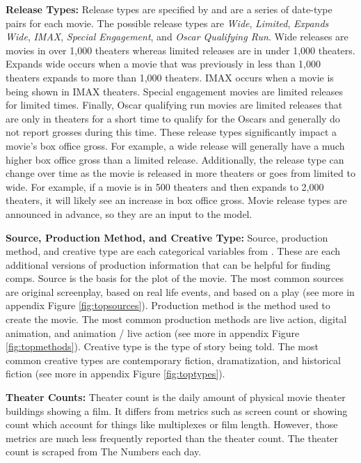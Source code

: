 \documentclass[12pt]{article}
\begin{document}
\textbf{Release Types:} Release types are specified by \cite{numbersHome} and are a series of date-type pairs for each movie. The possible release types are \textit{Wide}, \textit{Limited}, \textit{Expands Wide}, \textit{IMAX}, \textit{Special Engagement}, and \textit{Oscar Qualifying Run}. Wide releases are movies in over 1,000 theaters whereas limited releases are in under 1,000 theaters. Expands wide occurs when a movie that was previously in less than 1,000 theaters expands to more than 1,000 theaters. IMAX occurs when a movie is being shown in IMAX theaters. Special engagement movies are limited releases for limited times. Finally, Oscar qualifying run movies are limited releases that are only in theaters for a short time to qualify for the Oscars and generally do not report grosses during this time. These release types significantly impact a movie's box office gross. For example, a wide release will generally have a much higher box office gross than a limited release. Additionally, the release type can change over time as the movie is released in more theaters or goes from limited to wide. For example, if a movie is in 500 theaters and then expands to 2,000 theaters, it will likely see an increase in box office gross. Movie release types are announced in advance, so they are an input to the model.

\textbf{Source, Production Method, and Creative Type:} Source, production method, and creative type are each categorical variables from \cite{numbersHome}. These are each additional versions of production information that can be helpful for finding comps. Source is the basis for the plot of the movie. The most common sources are original screenplay, based on real life events, and based on a play (see more in appendix Figure \ref{fig:topsources}). Production method is the method used to create the movie. The most common production methods are live action, digital animation, and animation / live action (see more in appendix Figure \ref{fig:topmethods}). Creative type is the type of story being told. The most common creative types are contemporary fiction, dramatization, and historical fiction (see more in appendix Figure \ref{fig:toptypes}).

\textbf{Theater Counts:} Theater count is the daily amount of physical movie theater buildings showing a film. It differs from metrics such as screen count or showing count which account for things like multiplexes or film length. However, those metrics are much less frequently reported than the theater count. The theater count is scraped from The Numbers \citep{numbersHome} each day.
\end{document}
